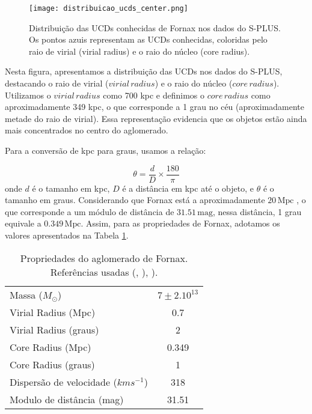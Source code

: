 \begin{figure}[!ht]
    \begin{center}
    \texttt{[image: distribuicao\_ucds\_center.png]}
    \caption[]{Distribuição das UCDs conhecidas de Fornax nos dados do S-PLUS. Os pontos azuis representam as UCDs conhecidas, coloridas pelo raio de virial (virial radius) e o raio do núcleo (core radius).}
    \label{distribuicao_ucds_center}
    \end{center}
\end{figure}

Nesta figura, apresentamos a distribuição das UCDs nos dados do S-PLUS, destacando o raio de virial ($virial \, radius$) e o raio do núcleo ($core \, radius$). Utilizamos o $virial \, radius$ como 700 kpc \citep{Drinkwater_2001} e definimos o $core \, radius$ como aproximadamente 349 kpc, o que corresponde a 1 grau no céu (aproximadamente metade do raio de virial). Essa representação evidencia que os objetos estão ainda mais concentrados no centro do aglomerado.

Para a conversão de kpc para graus, usamos a relação:

\begin{equation}
    \theta = \frac{d}{D} \times \frac{180}{\pi}
\end{equation}
onde $d$ é o tamanho em kpc, $D$ é a distância em kpc até o objeto, e $\theta$ é o tamanho em graus. Considerando que Fornax está a aproximadamente $20 \, \text{Mpc}$ \citep{Blakeslee_2009}, o que corresponde a um módulo de distância de $31.51 \, \text{mag}$, nessa distância, 1 grau equivale a $0.349 \, \text{Mpc}$. Assim, para as propriedades de Fornax, adotamos os valores apresentados na Tabela \ref{tab:properties_fornax}.

\begin{table}[!ht]
    \centering
    \caption{Propriedades do aglomerado de Fornax. Referências usadas (\citealp{Drinkwater_2001}, \citealp{Blakeslee_2009}), \citealp{Maddox_2019}).}   
    \begin{tabular}{lc}
        \toprule
        \midrule
        Massa ($M_\odot$) & $7\pm 2. 10^{13}$ \\
        Virial Radius (Mpc) & 0.7 \\
        Virial Radius (graus) & 2 \\
        Core Radius (Mpc) & 0.349 \\
        Core Radius (graus) & 1 \\
        Dispersão de velocidade ($km s^{-1}$) & 318 \\
        Modulo de distância (mag) & 31.51 \\
        \bottomrule
    \end{tabular}
    \label{tab:properties_fornax}
\end{table}

